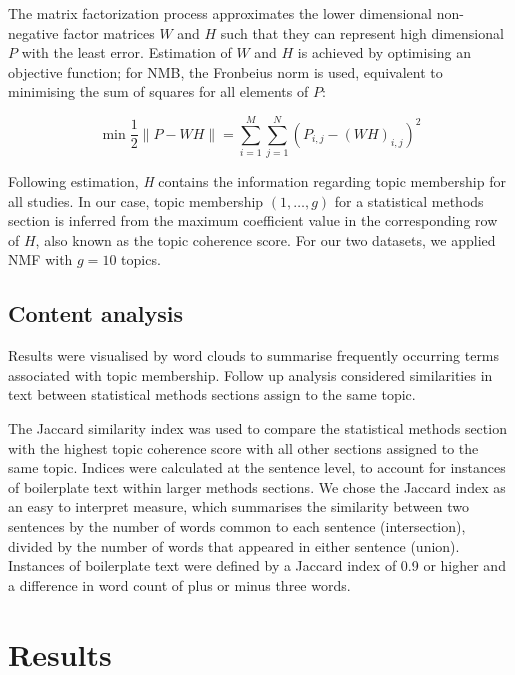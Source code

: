 \documentclass[12pt]{article}
\begin{document}
The matrix factorization process approximates the lower dimensional
non-negative factor matrices \(W\) and \(H\) such that they can
represent high dimensional \(P\) with the least error. Estimation of
\(W\) and \(H\) is achieved by optimising an objective function; for
NMB, the Fronbeius norm is used, equivalent to minimising the sum of
squares for all elements of \(P\):

\begin{equation}
\label{eq:NMFobjectivefn}
\min \frac{1}{2}\|P - WH\|= \sum _{i=1}^{M}\sum _{j=1}^{N} \left(  P_{i,j} -\left(WH \right)_{i,j} \right)^{2}
\end{equation}

Following estimation, \textit{H} contains the information regarding
topic membership for all studies. In our case, topic membership
\((1,\ldots,g)\) for a statistical methods section is inferred from the
maximum coefficient value in the corresponding row of \(H\), also known
as the topic coherence score. For our two datasets, we applied NMF with
\(g=10\) topics.

\subsection{Content analysis}

Results were visualised by word clouds to summarise
frequently occurring terms associated with topic membership. Follow up analysis considered 
similarities in text between statistical methods sections assign to the same topic.

The Jaccard similarity index was used to compare the statistical methods
section with the highest topic coherence score with all other sections
assigned to the same topic. Indices were calculated at the sentence
level, to account for instances of boilerplate text within larger
methods sections. We chose the Jaccard index as an easy to interpret
measure, which summarises the similarity between two sentences by the
number of words common to each sentence (intersection), divided by the
number of words that appeared in either sentence (union). Instances of
boilerplate text were defined by a Jaccard index of 0.9 or higher and a
difference in word count of plus or minus three words.

\clearpage

\section{Results}\label{results}
\end{document}
